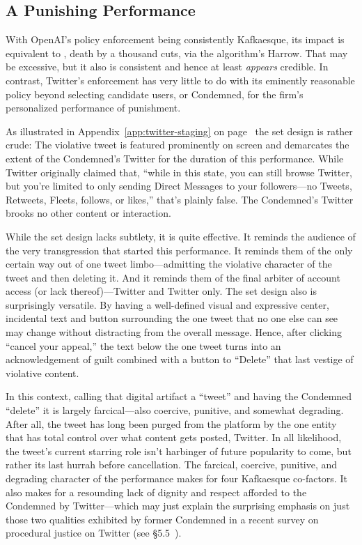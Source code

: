 \subsection{A Punishing Performance}

With OpenAI's policy enforcement being consistently Kafkaesque, its impact is
equivalent to \lingchi, death by a thousand cuts, via the algorithm's Harrow.
That may be excessive, but it also is consistent and hence at least
\emph{appears} credible. In contrast, Twitter's enforcement has very little to
do with its eminently reasonable policy beyond selecting candidate users, or
Condemned, for the firm's personalized performance of punishment.

As illustrated in Appendix~\ref{app:twitter-staging} on
page~\pageref{app:twitter-staging} the set design is rather crude: The
violative tweet is featured prominently on screen and demarcates the extent of
the Condemned's Twitter for the duration of this performance. While Twitter
originally claimed that, ``while in this state, you can still browse Twitter,
but you're limited to only sending Direct Messages to your followers---no
Tweets, Retweets, Fleets, follows, or likes,'' that's plainly false. The
Condemned's Twitter brooks no other content or interaction.

While the set design lacks subtlety, it is quite effective. It reminds the
audience of the very transgression that started this performance. It reminds
them of the only certain way out of one tweet limbo---admitting the violative
character of the tweet and then deleting it. And it reminds them of the final
arbiter of account access (or lack thereof)---Twitter and Twitter only. The set
design also is surprisingly versatile. By having a well-defined visual and
expressive center, incidental text and button surrounding the one tweet that no
one else can see may change without distracting from the overall message. Hence,
after clicking ``cancel your appeal,'' the text below the one tweet turns into
an acknowledgement of guilt combined with a button to ``Delete'' that last
vestige of violative content.

In this context, calling that digital artifact a ``tweet'' and having the
Condemned ``delete'' it is largely farcical---also coercive, punitive, and
somewhat degrading. After all, the tweet has long been purged from the platform
by the one entity that has total control over what content gets posted, Twitter.
In all likelihood, the tweet's current starring role isn't harbinger of future
popularity to come, but rather its last hurrah before cancellation. The
farcical, coercive, punitive, and degrading character of the performance makes
for four Kafkaesque co-factors. It also makes for a resounding lack of dignity
and respect afforded to the Condemned by Twitter---which may just explain the
surprising emphasis on just those two qualities exhibited by former Condemned in
a recent survey on procedural justice on Twitter (see
\S5.5~\cite{KatsarosTylerea2022}).

